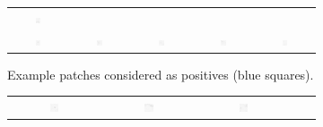 \begin{figure}
\begin{subfigure}{\textwidth}
\begin{tabular}{c@{\,}c@{\,}c@{\,}c@{\,}c@{}}
			\includegraphics[width=0.1\textwidth]{fig01b10} \\
			\includegraphics[width=0.1\textwidth]{fig01b11} &
			\includegraphics[width=0.1\textwidth]{fig01b12} &
			\includegraphics[width=0.1\textwidth]{fig01b13} &
			\includegraphics[width=0.1\textwidth]{fig01b14} &
			\includegraphics[width=0.1\textwidth]{fig01b15}
		\end{tabular}
	\vspace{-0.5em}
		\caption{Example patches considered as positives (blue squares).}
		\vspace{1em}
	\end{subfigure}
	\begin{subfigure}{\textwidth}
		\centering
		\begin{tabular}{c@{\,}c@{\,}c@{\,}c@{\,}c@{}}
				\includegraphics[width=0.1\textwidth]{fig01c01} &
				\includegraphics[width=0.1\textwidth]{fig01c02} &
				\includegraphics[width=0.1\textwidth]{fig01c03} &

\end{tabular}
\end{subfigure}
\end{figure}
